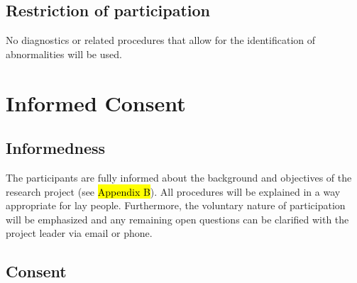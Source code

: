\documentclass[11pt,twoside,a4paper]{article}
\begin{document}
\subsection{Restriction of participation}


No diagnostics or related procedures that allow for the identification of abnormalities will be used.

\section{Informed Consent}

\subsection{Informedness}


The participants are fully informed about the background and objectives of the research project (see \hl{Appendix B}).
All procedures will be explained in a way appropriate for lay people.
Furthermore, the voluntary nature of participation will be emphasized and any remaining open questions can be clarified with the project leader via email or phone.

\subsection{Consent}

\end{document}
